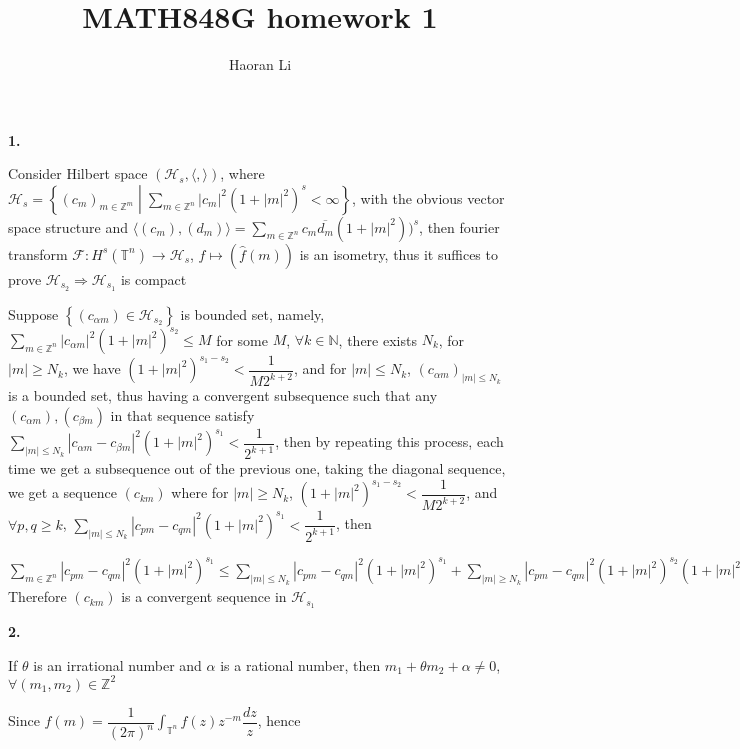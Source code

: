 \documentclass[10pt]{article}
\title{MATH848G homework 1}
\author{Haoran Li}
\date{}
\begin{document}
\maketitle

\textbf{1.} \par
Consider Hilbert space $(\mathcal{H}_s,\langle,\rangle)$, where $\displaystyle\mathcal{H}_s=\left\{(c_m)_{m\in\mathbb{Z}^m}\middle\vert\sum_{m\in\mathbb{Z}^n}|c_m|^2(1+|m|^2)^s<\infty\right\}$, with the obvious vector space structure and $\displaystyle\langle (c_m),(d_m)\rangle=\sum_{m\in\mathbb{Z}^n}c_m\overline{d_m}(1+|m|^2))^s$, then fourier transform $\mathcal{F}:H^s(\mathbb{T}^n)\rightarrow\mathcal{H}_s$, $f\mapsto (\widehat{f}(m))$ is an isometry, thus it suffices to prove $\mathcal{H}_{s_2}\Rightarrow\mathcal{H}_{s_1}$ is compact \par
Suppose $\left\{(c_{\alpha m})\in \mathcal{H}_{s_2}\right\}$ is bounded set, namely, $\displaystyle\sum_{m\in\mathbb{Z}^n}|c_{\alpha m}|^2(1+|m|^2)^{s_2}\leq M$ for some $M$, $\forall k\in\mathbb{N}$, there exists $N_k$, for $|m|\geq N_k$, we have $(1+|m|^2)^{s_1-s_2}<\dfrac{1}{M2^{k+2}}$, and for $|m|\leq N_k$, $(c_{\alpha m})_{|m|\leq N_k}$ is a bounded set, thus having a convergent subsequence such that any $(c_{\alpha m}),(c_{\beta m})$ in that sequence satisfy $\displaystyle\sum_{|m|\leq N_k}|c_{\alpha m}-c_{\beta m}|^2(1+|m|^2)^{s_1}<\dfrac{1}{2^{k+1}}$, then by repeating this process, each time we get a subsequence out of the previous one, taking the diagonal sequence, we get a sequence $(c_{km})$ where for $|m|\geq N_k$, $(1+|m|^2)^{s_1-s_2}<\dfrac{1}{M2^{k+2}}$, and $\forall p,q\geq k$, $\displaystyle\sum_{|m|\leq N_k}|c_{pm}-c_{qm}|^2(1+|m|^2)^{s_1}<\dfrac{1}{2^{k+1}}$, then \par
$\displaystyle\sum_{m\in\mathbb{Z}^n}|c_{pm}-c_{qm}|^2(1+|m|^2)^{s_1}\leq\sum_{|m|\leq N_k}|c_{pm}-c_{qm}|^2(1+|m|^2)^{s_1}+\sum_{|m|\geq N_k}|c_{pm}-c_{qm}|^2(1+|m|^2)^{s_2}(1+|m|^2)^{s_1-s_2}<\dfrac{1}{2^{k+1}}+\dfrac{1}{M2^{k+2}}\sum_{m\in\mathbb{Z}^n}|c_{pm}-c_{qm}|^2(1+|m|^2)^{s_2}<\dfrac{1}{2^k}$
Therefore $(c_{km})$ is a convergent sequence in $\mathcal{H}_{s_1}$ \par
\textbf{2.} \par
If $\theta$ is an irrational number and $\alpha$ is a rational number, then $m_1+\theta m_2+\alpha\neq0$, $\forall(m_1,m_2)\in\mathbb{Z}^2$ \par
Since $\displaystyle\widehat{f}(m)=\dfrac{1}{(2\pi)^n}\int_{\mathbb{T}^n}f(z)z^{-m}\dfrac{dz}{z}$, hence \par
\end{document}

